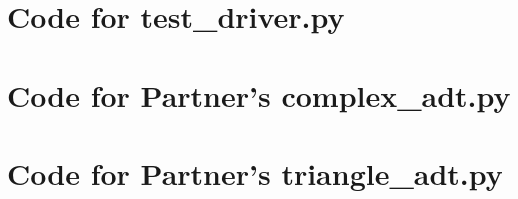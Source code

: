 \documentclass[12pt]{article}
\begin{document}
\newpage

\section{Code for test\_driver.py}

\noindent 

\newpage

\section{Code for Partner's complex\_adt.py}

\noindent 

\section{Code for Partner's triangle\_adt.py}

\noindent 
\end{document}
